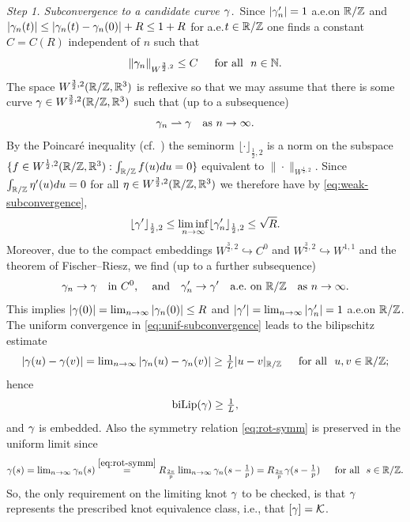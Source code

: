 {\it Step 1. Subconvergence to a candidate curve $\gamma$.}\,
Since $|\gamma_n'|=1$ a.e.\@ on $\mathbb{R}/\mathbb{Z}$ and $|\gamma_n(t)|\le
|\gamma_n(t)-\gamma_n(0)|+R\le 1+R$ for a.e.\@ $t\in\mathbb{R}/\mathbb{Z}$ one finds a constant
$C=C(R)$ independent of $n$ such that
\begin{equation}\label{eq:w3halbe-bound}
\|\gamma_n\|_{W^{\frac32,2}}\le C\quad\,\,\,\text{for all }\,\, n\in\mathbb{N}.
\end{equation}
The space $W^{\frac32,2}(\mathbb{R}/\mathbb{Z},\mathbb{R}^3)$ is reflexive so that we may
assume that there is some curve $\gamma\in W^{\frac32,2}
(\mathbb{R}/\mathbb{Z},\mathbb{R}^3)$ such that (up to a subsequence)
\begin{equation}\label{eq:weak-subconvergence}
\gamma_n\rightharpoonup \gamma \quad\textnormal{as $n\to\infty$.}
\end{equation}
By the Poincar\'e inequality (cf.~\cite[Proposition A.3]{knappmann-etal_2022}) the seminorm $\lfloor\cdot
\rfloor_{\frac12,2}$ is a norm on the subspace $\{f\in 
W^{\frac12,2}(\mathbb{R}/\mathbb{Z},\mathbb{R}^3):\int_{\mathbb{R}/\mathbb{Z}}f(u)du=0\}$ 
equivalent to $\|\cdot\|_{W^{\frac12,2}}$. Since $%
\int_{\R/\Z}\eta'(u)du=0$
for all $\eta\in W^{\frac32,2}(\mathbb{R}/\mathbb{Z},\mathbb{R}^3)$ we therefore have by 
\eqref{eq:weak-subconvergence},
\begin{equation}\label{eq:uhs-seminorm}
\lfloor\gamma'\rfloor_{\frac12,2}\le\liminf_{n\to\infty}\lfloor\gamma_n'
\rfloor_{\frac12,2}\le \sqrt{R}.
\end{equation}
Moreover, due to the compact embeddings $W^{\frac32,2}\hookrightarrow
C^0$ and $W^{\frac32,2}\hookrightarrow
W^{1,1}$ and the theorem of Fischer--Riesz, we find (up to a further
subsequence)
\begin{equation}\label{eq:unif-subconvergence}
\g_n\to\g\quad\textnormal{in $C^0$, \quad and}\quad
\g_n'\to\g'\quad\textnormal{a.e.\@ on $\R/\Z$\quad as $n\to\infty$.}
\end{equation}
This implies $|\gamma(0)|=\lim_{n\to\infty}|\gamma_n(0)|\le R$ and
$|\gamma'|=\lim_{n\to\infty}|\gamma_n'|=1$ a.e.\@ on $\mathbb{R}/\mathbb{Z}$. The uniform
convergence in \eqref{eq:unif-subconvergence} leads to the bilipschitz
estimate
$$
\textstyle
|\gamma(u)-\gamma(v)|=\lim_{n\to\infty}
|\gamma_n(u)-\gamma_n(v)|\ge\frac1{L}|u-v|_{\mathbb{R}/\mathbb{Z}}\quad\,\,\,\text{for all }\,\, u,v\in\mathbb{R}/\mathbb{Z};
$$
hence 
\begin{equation}\label{eq:bilip-gamma}
\textstyle
\operatorname{biLip}(\gamma)\ge\frac1{L},
\end{equation}
and $\gamma$ is embedded. 
Also the symmetry relation \eqref{eq:rot-symm} is preserved in the uniform
limit
since
$$
\textstyle
\gamma(s)=\lim_{n\to\infty}\gamma_n(s)\overset{\eqref{eq:rot-symm}}{=}
R_{\frac{2\pi}p}\lim_{n\to\infty}\gamma_n(s-\frac1{p})=
R_{\frac{2\pi}p}\gamma(s-\frac1{p})\quad\,\,\,\text{for all }\,\, s\in\mathbb{R}/\mathbb{Z}.
$$
So, the only requirement on the limiting knot $\gamma$ to be checked, 
is that $\gamma$ represents the prescribed knot equivalence
class, i.e., that $[\gamma]=\mathcal{K}$. 

